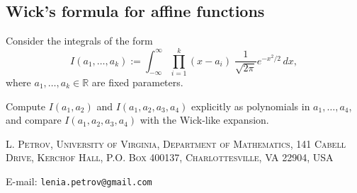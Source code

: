 \documentclass[letterpaper,11pt,oneside,reqno]{article}
\numberwithin{equation}{section}
\theoremstyle{definition}
\begin{document}
\subsection{Wick's formula for affine functions}
\label{prob:wick-linear}
Consider the integrals of the form
\[
	I(a_1, \ldots, a_k) := \int_{-\infty}^\infty \prod_{i=1}^k (x - a_i)\; \frac{1}{\sqrt{2\pi}} e^{-x^2/2}\, dx,
\]
where $a_1, \ldots, a_k \in \mathbb{R}$ are fixed parameters.

Compute $I(a_1, a_2)$ and $I(a_1, a_2, a_3, a_4)$ explicitly as polynomials in $a_1,\ldots, a_4$,
and compare $I(a_1, a_2, a_3, a_4)$ with the Wick-like expansion.








\medskip

\textsc{L. Petrov, University of Virginia, Department of Mathematics, 141 Cabell Drive, Kerchof Hall, P.O. Box 400137, Charlottesville, VA 22904, USA}

E-mail: \texttt{lenia.petrov@gmail.com}
\end{document}
